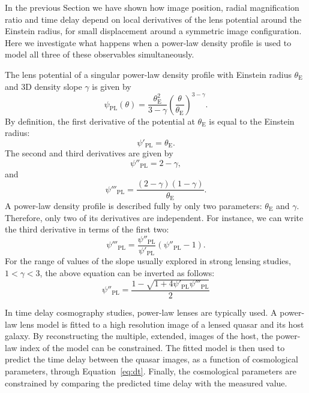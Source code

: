 \documentclass[usenatbib]{mnras}
\def\psiiii{\psi'''}
\def\tein{\theta_{\mathrm{E}}}
\def\Eref#1{Equation~\ref{#1}\xspace}
\begin{document}
In the previous Section we have shown how image position, radial magnification ratio and time delay depend on local derivatives of the lens potential around the Einstein radius, for small displacement around a symmetric image configuration.
Here we investigate what happens when a power-law density profile is used to model all three of these observables simultaneously.

The lens potential of a singular power-law density profile with Einstein radius $\tein$ and 3D density slope $\gamma$ is given by
\begin{equation}
\psi_{\mathrm{PL}}(\theta) = \frac{\tein^2}{3-\gamma}\left(\frac{\theta}{\tein}\right)^{3-\gamma}.
\end{equation}
By definition, the first derivative of the potential at $\tein$ is equal to the Einstein radius: 
\begin{equation}
\psi'_{\mathrm{PL}} = \tein.
\end{equation}
The second and third derivatives are given by
\begin{equation}\label{eq:psiiipl}
\psi''_{\mathrm{PL}} = 2 - \gamma,
\end{equation}
and
\begin{equation}
\psi'''_{\mathrm{PL}} = \frac{(2-\gamma)(1-\gamma)}{\tein}.
\end{equation}
A power-law density profile is described fully by only two parameters: $\tein$ and $\gamma$. Therefore, only two of its derivatives are independent. For instance, we can write the third derivative in terms of the first two:
\begin{equation}
\psi'''_{\mathrm{PL}} = \frac{\psi''_{\mathrm{PL}}}{\psi'_{\mathrm{PL}}}(\psi''_{\mathrm{PL}} - 1).
\end{equation}
For the range of values of the slope usually explored in strong lensing studies, $1 < \gamma < 3$, the above equation can be inverted as follows:
\begin{equation}\label{eq:psiiipl_given_psiiii}
\psi''_{\mathrm{PL}} = \frac{1 - \sqrt{1 + 4\psi'_{\mathrm{PL}}\psiiii_{\mathrm{PL}}}}{2}
\end{equation}

In time delay cosmography studies, power-law lenses are typically used.
A power-law lens model is fitted to a high resolution image of a lensed quasar and its host galaxy. By reconstructing the multiple, extended, images of the host, the power-law index of the model can be constrained.
The fitted model is then used to predict the time delay between the quasar images, as a function of cosmological parameters, through \Eref{eq:dt}. Finally, the cosmological parameters are constrained by comparing the predicted time delay with the measured value.
\end{document}
